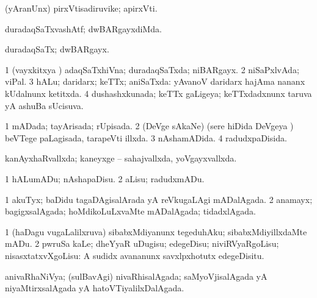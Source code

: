 {{\bentry
{} 
\gl{\nA}
\expl{}
\bmng
(yAranUnx) pirxVtisadiruvike; apirxVti. 
\emng
\eentry

\bentry
{} 
\gl{\kirxvi}
\expl{}
\bmng
duradaqSaTxvashAtf; dwBARgayxdiMda. 
\emng
\eentry

\bentry
{} 
\gl{\nA}
\expl{}
\bmng
duradaqSaTx; dwBARgayx. 
\emng
\eentry

\bentry
{} 
\gl{\gu}
\bmng
\bnum
\num{1} (vayxkitxya \vi) adaqSaTxhiVna; duradaqSaTxda; niBARgayx. 
\num{2} niSaPxlvAda; viPal. 
\num{3} hALu; daridarx; keTTx; aniSaTxda:  yAvanoV daridarx hajAma nananx kUdalnunx ketitxda. 
\num{4} dushashxkunada; keTTx gaLigeya; keTTxdadxnunx taruva yA ashuBa sUcisuva. 
\enum
\emng
\eentry

\bentry
{} 
\gl{\gu}
\bmng
\bnum
\num{1} mADada; tayArisada; rUpisada. 
\num{2} (DeVge sAkaNe) (sere hiDida DeVgeya \vi) beVTege paLagisada, tarapeVti illxda. 
\num{3} nAshamADida. 
\num{4} radudxpaDisida. 
\enum
\emng
\eentry

\bentry
{} 
\gl{\gu}
\expl{}
\bmng
kanAyxhaRvallxda; kaneyxge -- sahajvallxda, yoVgayxvallxda. 
\emng
\eentry

\bentry
{} 
\gl{\akirx}
\bmng
\bnum
\num{1} hALumADu; nAshapaDisu. 
\num{2} aLisu; radudxmADu. 
\enum
\emng
\eentry

\bentry
{} 
\gl{\gu}
\expl{}
\bmng
\bnum
\num{1} akuTyx; baDidu tagaDAgisalArada yA reVkugaLAgi mADalAgada. 
\num{2} anamayx; bagigxsalAgada; hoMdikoLuLxvaMte mADalAgada; tidadxlAgada. 
\enum
\emng
\eentry

\bentry
{} 
\gl{\akirx}
\bmng
\bnum
\num{1} (haDagu \mo vugaLalilxruva) sibabxMdiyanunx tegeduhAku; sibabxMdiyillxdaMte mADu. 
\num{2} pwruSa kaLe; dheYyaR uDugisu; edegeDisu; niviRVyaRgoLisu; nisasxtatxvXgoLisu:  A sudidx avananunx savxlpxhotutx edegeDisitu. 
\enum
\emng
\eentry

\bentry
{} 
\gl{\gu}
\expl{}
\bmng
anivaRhaNiVya; (sulBavAgi) nivaRhisalAgada; saMyoVjisalAgada yA niyaMtirxsalAgada yA hatoVTiyalilxDalAgada. 
\emng
\eentry

}}
